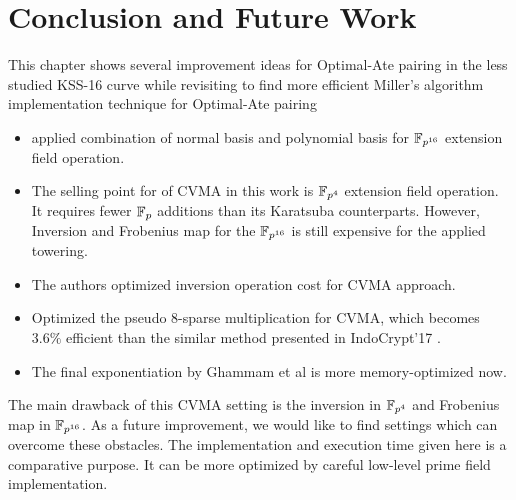 \section{Conclusion and Future Work}\label{sec:5}
This chapter shows several improvement ideas for Optimal-Ate pairing in the less studied KSS-16 curve while revisiting \cite{INDOCRYPT:KNGDNK17} to find more efficient Miller's algorithm implementation technique for Optimal-Ate pairing
\begin{itemize}
	\item applied combination of normal basis  and polynomial basis for $\mathbb{F}_{p^{16}}$ extension field operation.
\item	The selling point for of CVMA in this work is $\mathbb{F}_{p^4}$ extension field operation. 
	It requires fewer $\mathbb{F}_p$ additions than its Karatsuba counterparts. 
	However, Inversion and Frobenius map for the $\mathbb{F}_{p^{16}}$ is still expensive for the applied towering.
	\item The authors optimized inversion operation cost for CVMA approach.
	\item  Optimized the pseudo 8-sparse multiplication for CVMA, which becomes $3.6\%$ efficient than the similar method presented in IndoCrypt'17 \cite{INDOCRYPT:KNGDNK17}.
	\item  The final exponentiation by Ghammam et al \cite{EPRINT:GhaFou16b} is more memory-optimized now. 
\end{itemize}
The main drawback of this CVMA setting is the inversion in $\mathbb{F}_{p^4}$ and Frobenius map in $\mathbb{F}_{p^{16}}$.
As a future improvement, we would like to find settings which can overcome these obstacles. 
The implementation and execution time given here is a comparative purpose. It can be more optimized by careful low-level prime field implementation.

